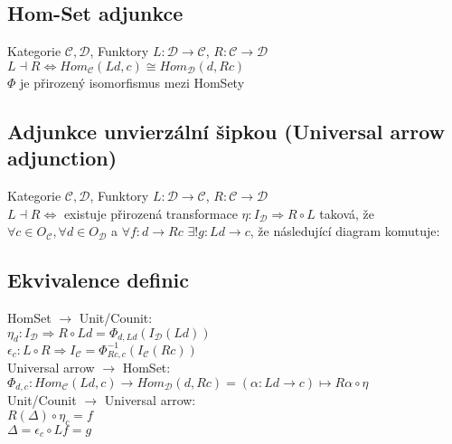 \documentclass{article}
\begin{document}
\subsection*{Hom-Set adjunkce}
Kategorie $\mathcal{C}, \mathcal{D}$, Funktory $L:\mathcal{D} \to \mathcal{C}$, $R:\mathcal{C} \to \mathcal{D}$\\
$L \dashv{} R \iff Hom_\mathcal{C}(Ld, c) \cong{} Hom_\mathcal{D}(d, Rc)$\\
$\Phi$ je přirozený isomorfismus mezi HomSety\\
\begin{center}
\end{center}
\subsection*{Adjunkce unvierzální šipkou (Universal arrow adjunction)}
Kategorie $\mathcal{C}, \mathcal{D}$, Funktory $L:\mathcal{D} \to \mathcal{C}$, $R:\mathcal{C} \to \mathcal{D}$\\
$L \dashv{} R \iff$ existuje přirozená transformace $\eta:I_\mathcal{D} \Rightarrow R \circ L$  taková, že $\forall c \in O_\mathcal{C}, \forall d\in O_\mathcal{D}$ a $\forall f: d \to Rc$ $\exists! g: Ld \to c$, že následující diagram  komutuje: \\
\begin{center}
\end{center}

\subsection*{Ekvivalence definic}
HomSet $\to$ Unit/Counit:\\
$\eta_d:I_\mathcal{D}\Rightarrow R \circ L d = \Phi_{d, Ld}(I_\mathcal{D}(Ld))$\\
$\epsilon_c:L \circ R \Rightarrow I_\mathcal{C} = \Phi_{Rc, c}^{-1}(I_\mathcal{C}(Rc))$
\medskip\\
Universal arrow $\to$ HomSet:\\
$\Phi_{d,c}:Hom_\mathcal{C}(Ld, c) \to Hom_\mathcal{D}(d, Rc) = (\alpha:Ld \to c) \mapsto R\alpha \circ \eta$
\medskip\\
Unit/Counit $\to$ Universal arrow:\\
$R(\Delta) \circ \eta_c=f$\\
$\Delta = \epsilon_c \circ Lf= g$
\end{document}
